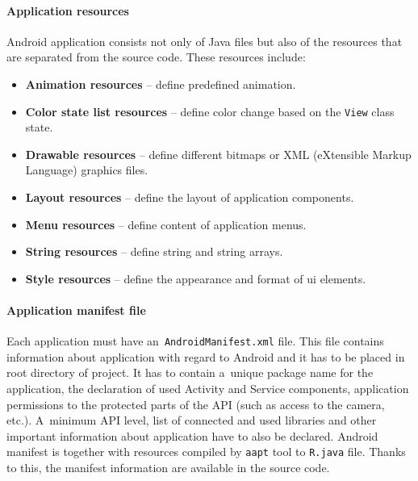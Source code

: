 \paragraph{Application resources}
Android application consists not only of Java files but also of the resources that are separated from the source code.
These resources include:

\begin{itemize}
    \item \textbf{Animation resources} -- define predefined animation.
    \item \textbf{Color state list resources} -- define color change based on the \texttt{View} class state.
    \item \textbf{Drawable resources} -- define different bitmaps or XML (eXtensible Markup Language) graphics files.
    \item \textbf{Layout resources} -- define the layout of application components.
    \item \textbf{Menu resources} -- define content of application menus.
    \item \textbf{String resources} -- define string and string arrays.
    \item \textbf{Style resources} -- define the appearance and format of ui elements.
\end{itemize}

\paragraph{Application manifest file}
Each application must have an~\texttt{AndroidManifest.xml} file. This file contains information about application with
regard to Android and it has to be placed in root directory of project. It has to contain a~unique package name for the
application, the declaration of used Activity and Service components, application permissions to the protected parts of
the API (such as access to the camera, etc.). A~minimum API level, list of connected and used libraries and other
important information about application have to also be declared. Android manifest is together with resources compiled
by \texttt{aapt} tool to \texttt{R.java} file. Thanks to this, the manifest information are available in the source
code.

